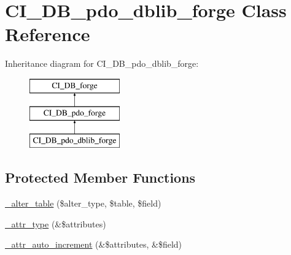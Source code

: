 \hypertarget{class_c_i___d_b__pdo__dblib__forge}{}\section{C\+I\+\_\+\+D\+B\+\_\+pdo\+\_\+dblib\+\_\+forge Class Reference}
\label{class_c_i___d_b__pdo__dblib__forge}
Inheritance diagram for C\+I\+\_\+\+D\+B\+\_\+pdo\+\_\+dblib\+\_\+forge\+:\begin{figure}[H]
\begin{center}
\leavevmode
\includegraphics[height=3.000000cm]{class_c_i___d_b__pdo__dblib__forge}
\end{center}
\end{figure}
\subsection*{Protected Member Functions}
\begin{DoxyCompactItemize}
\item 
\mbox{\hyperlink{class_c_i___d_b__pdo__dblib__forge_aacc49b1b1373531e6b3a96638e669313}{\+\_\+alter\+\_\+table}} (\$alter\+\_\+type, \$table, \$field)
\item 
\mbox{\hyperlink{class_c_i___d_b__pdo__dblib__forge_a98df1c86cf2bac9ac8022c7b00e65313}{\+\_\+attr\+\_\+type}} (\&\$attributes)
\item 
\mbox{\hyperlink{class_c_i___d_b__pdo__dblib__forge_a0dc49a5ded8efccbed2857592c80ed51}{\+\_\+attr\+\_\+auto\+\_\+increment}} (\&\$attributes, \&\$field)
\end{DoxyCompactItemize}
